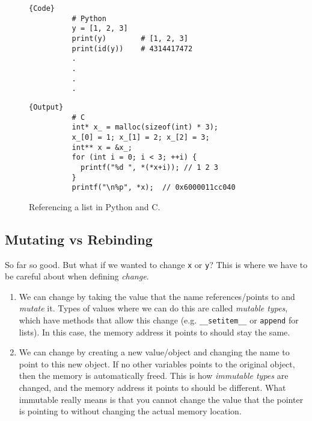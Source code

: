 \documentclass{article}
\begin{document}
    \begin{figure}[H]
      \centering 
      \begin{minipage}{.5\textwidth}
        \begin{lstlisting}[]{Code}
          # Python 
          y = [1, 2, 3]
          print(y)        # [1, 2, 3]
          print(id(y))    # 4314417472
          .
          .
          .
          .
        \end{lstlisting}
        \end{minipage}
        \hfill
        \begin{minipage}{.49\textwidth}
        \begin{lstlisting}[]{Output}
          # C  
          int* x_ = malloc(sizeof(int) * 3); 
          x_[0] = 1; x_[1] = 2; x_[2] = 3; 
          int** x = &x_; 
          for (int i = 0; i < 3; ++i) {
            printf("%d ", *(*x+i)); // 1 2 3
          }
          printf("\n%p", *x);  // 0x6000011cc040
        \end{lstlisting}
      \end{minipage}
      \caption{Referencing a list in Python and C.} 
      \label{fig:list}
    \end{figure}

  \subsection{Mutating vs Rebinding}

    So far so good. But what if we wanted to change \texttt{x} or \texttt{y}? This is where we have to be careful about when defining \textit{change}. 
    \begin{enumerate}
      \item We can change by taking the value that the name references/points to and \textit{mutate} it. Types of values where we can do this are called \textit{mutable types}, which have methods that allow this change (e.g. \texttt{\_\_setitem\_\_} or \texttt{append} for lists). In this case, the memory address it points to should stay the same. 
      \item We can change by creating a new value/object and changing the name to point to this new object. If no other variables points to the original object, then the memory is automatically freed. This is how \textit{immutable types} are changed, and the memory address it points to should be different. What immutable really means is that you cannot change the value that the pointer is pointing to without changing the actual memory location. 
    \end{enumerate}
\end{document}

